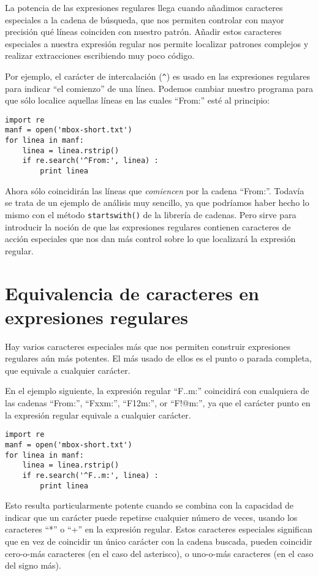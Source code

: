 La potencia de las expresiones regulares llega cuando añadimos caracteres especiales a la cadena de
búsqueda, que nos permiten controlar con mayor precisión qué líneas coinciden con nuestro patrón.
Añadir estos caracteres especiales a nuestra expresión regular nos permite localizar patrones
complejos y realizar extracciones escribiendo muy poco código.

Por ejemplo, el carácter de intercalación (\verb"^") es usado en las expresiones
regulares para indicar ``el comienzo'' de una línea.
Podemos cambiar nuestro programa para que sólo localice
aquellas líneas en las cuales ``From:'' esté al principio:

\beforeverb
\begin{verbatim}
import re
manf = open('mbox-short.txt')
for linea in manf:
    linea = linea.rstrip()
    if re.search('^From:', linea) :
        print linea
\end{verbatim}
\afterverb
%
Ahora sólo coincidirán las líneas que {\em comiencen} por la cadena ``From:''. Todavía se trata
de un ejemplo de análisis muy sencillo, ya que podríamos haber hecho lo mismo con el método
{\tt startswith()} de la librería de cadenas. Pero sirve para introducir la noción de que las expresiones
regulares contienen caracteres de acción especiales que nos dan más control sobre lo que localizará
la expresión regular.

\section{Equivalencia de caracteres en expresiones regulares}

Hay varios caracteres especiales más que nos permiten construir expresiones regulares aún más potentes.
El más usado de ellos es el punto o parada completa, que equivale
a cualquier carácter.

En el ejemplo siguiente, la expresión regular ``F..m:'' coincidirá con cualquiera de las cadenas
``From:'', ``Fxxm:'', ``F12m:'', or ``F!@m:'', ya que el carácter punto en la expresión regular
equivale a cualquier carácter.

\beforeverb
\begin{verbatim}
import re
manf = open('mbox-short.txt')
for linea in manf:
    linea = linea.rstrip()
    if re.search('^F..m:', linea) :
        print linea
\end{verbatim}
\afterverb
%
Esto resulta particularmente potente cuando se combina con la capacidad de indicar que un carácter
puede repetirse cualquier número de veces, usando los caracteres ``*'' o ``+'' en la expresión regular.
Estos caracteres especiales significan que en vez de coincidir un único carácter con la cadena buscada,
pueden coincidir cero-o-más caracteres (en el caso del asterisco), o uno-o-más caracteres
(en el caso del signo más).

